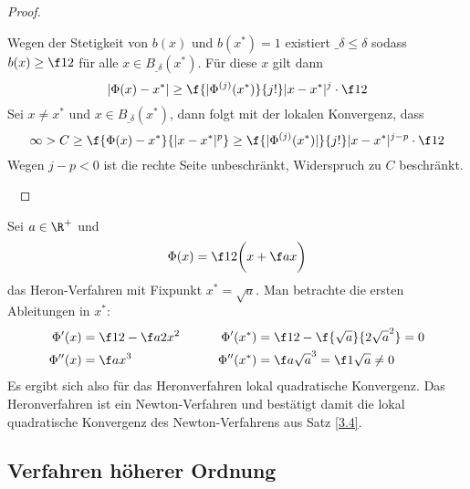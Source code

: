\documentclass[11pt]{scrartcl}
\begin{document}
\begin{st}[Konvergenzordnung für Iterationsverfahren, $n=1$]
\begin{proof}
\begin{seg}[„$\Longrightarrow$“]
\begin{seg}[$p\ge 2$]
				Wegen der Stetigkeit von $b(x)$ und $b(x^*)=1$ existiert $\_\delta \le \delta$ sodass $b(x) \ge \f 12$ für alle $x\in B_{\_\delta}(x^*)$.
				Für diese $x$ gilt dann
				\[
					|\Phi(x) - x^*| \ge \f {|\Phi^{(j)}(x^*)}{j!}|x-x^*|^j \cdot \f 12
				\]
				Sei $x\neq x^*$ und $x\in B_{\_\delta}(x^*)$, dann folgt mit der lokalen Konvergenz, dass
				\[
					\infty > C \ge \f {\Phi(x)-x^*}{|x-x^*|^p} \ge \f {|\Phi^{(j)}(x^*)|}{j!} |x-x^*|^{j-p} \cdot \f 12
				\]
				Wegen $j-p < 0$ ist die rechte Seite unbeschränkt, Widerspruch zu $C$ beschränkt.
			\end{seg}
		\end{seg}~
	\end{proof}
\end{st}

\begin{ex*}
	Sei $a\in \R^+$ und
	\[
		\Phi(x) = \f 12 \bigg(x + \f ax\bigg)
	\]
	das Heron-Verfahren mit Fixpunkt $x^* = \sqrt a$.
	Man betrachte die ersten Ableitungen in $x^*$:
	\begin{alignat*}{2}
		\Phi'(x) &= \f 12 - \f a{2x^2} & \qquad \Phi'(x^*) &= \f 12 - \f {\sqrt a}{2\sqrt{a}^2} = 0 \\
		\Phi''(x) &= \f a{x^3} & \qquad \Phi''(x^*) &= \f a{\sqrt{a}^3} = \f 1{\sqrt a} \neq 0
	\end{alignat*}
	Es ergibt sich also für das Heronverfahren lokal quadratische Konvergenz.
	Das Heronverfahren ist ein Newton-Verfahren und bestätigt damit die lokal quadratische Konvergenz des Newton-Verfahrens aus Satz \ref{3.4}.
\end{ex*}


\subsection{Verfahren höherer Ordnung}
\end{document}
